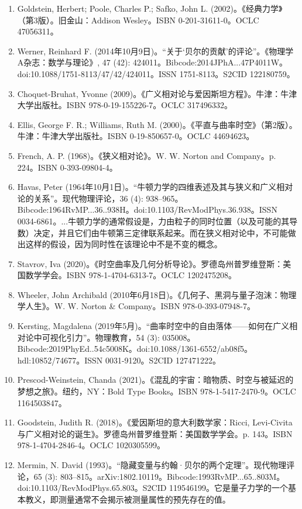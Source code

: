 \begin{enumerate}
\item Goldstein, Herbert; Poole, Charles P.; Safko, John L. (2002)。《经典力学》（第3版）。旧金山：Addison Wesley。ISBN 0-201-31611-0。OCLC 47056311。
\item Werner, Reinhard F. (2014年10月9日)。“关于‘贝尔的贡献’的评论”。《物理学A杂志：数学与理论》, 47 (42): 424011。Bibcode:2014JPhA...47P4011W。doi:10.1088/1751-8113/47/42/424011。ISSN 1751-8113。S2CID 122180759。
\item Choquet-Bruhat, Yvonne (2009)。《广义相对论与爱因斯坦方程》。牛津：牛津大学出版社。ISBN 978-0-19-155226-7。OCLC 317496332。
\item Ellis, George F. R.; Williams, Ruth M. (2000)。《平直与曲率时空》（第2版）。牛津：牛津大学出版社。ISBN 0-19-850657-0。OCLC 44694623。
\item French, A. P. (1968)。《狭义相对论》。W. W. Norton and Company。p. 224。ISBN 0-393-09804-4。
\item Havas, Peter (1964年10月1日)。“牛顿力学的四维表述及其与狭义和广义相对论的关系”。现代物理评论，36 (4): 938–965。Bibcode:1964RvMP...36..938H。doi:10.1103/RevModPhys.36.938。ISSN 0034-6861。...牛顿力学的通常假设是，力由粒子的同时位置（以及可能的其导数）决定，并且它们由牛顿第三定律联系起来。而在狭义相对论中，不可能做出这样的假设，因为同时性在该理论中不是不变的概念。
\item Stavrov, Iva (2020)。《时空曲率及几何分析导论》。罗德岛州普罗维登斯：美国数学学会。ISBN 978-1-4704-6313-7。OCLC 1202475208。
\item Wheeler, John Archibald (2010年6月18日)。《几何子、黑洞与量子泡沫：物理学人生》。W. W. Norton & Company。ISBN 978-0-393-07948-7。
\item Kersting, Magdalena (2019年5月)。“曲率时空中的自由落体——如何在广义相对论中可视化引力”。物理教育，54 (3): 035008。Bibcode:2019PhyEd..54c5008K。doi:10.1088/1361-6552/ab08f5。hdl:10852/74677。ISSN 0031-9120。S2CID 127471222。
\item Prescod-Weinstein, Chanda (2021)。《混乱的宇宙：暗物质、时空与被延迟的梦想之旅》。纽约，NY：Bold Type Books。ISBN 978-1-5417-2470-9。OCLC 1164503847。
\item Goodstein, Judith R. (2018)。《爱因斯坦的意大利数学家：Ricci, Levi-Civita与广义相对论的诞生》。罗德岛州普罗维登斯：美国数学学会。p. 143。ISBN 978-1-4704-2846-4。OCLC 1020305599。
\item Mermin, N. David (1993)。“隐藏变量与约翰·贝尔的两个定理”。现代物理评论，65 (3): 803–815。arXiv:1802.10119。Bibcode:1993RvMP...65..803M。doi:10.1103/RevModPhys.65.803。S2CID 119546199。它是量子力学的一个基本教义，即测量通常不会揭示被测量属性的预先存在的值。

\end{enumerate}
